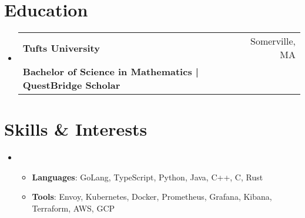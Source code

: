 \documentclass[letterpaper,11pt]{article}
\makeatletter
\newcommand{\cvitem}[1]{
  \item\small{
    {#1\vspace{-2pt}}
  }
}
\newcommand{\cvheading}[4]{
  \vspace{-2pt}\item
    \begin{tabular*}{\textwidth}[t]{l@{\extracolsep{\fill}}r}
      \textbf{#1} & #2 \\
      \small#3 & \small #4 \\
    \end{tabular*}\vspace{-9pt}
}
\newcommand{\cvheadingstart}{\begin{itemize}[leftmargin=0in, label={}]}
\newcommand{\cvheadingend}{\end{itemize}}
\newcommand{\cvitemstart}{\begin{itemize}\justifying}
\newcommand{\cvitemend}{\end{itemize}\vspace{-5pt}}
\makeatother
\begin{document}
\section{Education}
\cvheadingstart
  \cvheading
    {Tufts University}{Somerville, MA}
    {\textbf{Bachelor of Science in Mathematics | QuestBridge Scholar} }{}
\cvheadingend

\section{Skills \& Interests}
\cvheadingstart
\item
\cvitemstart
    \cvitem{\textbf{Languages}: GoLang, TypeScript, Python, Java, C++, C, Rust}
    \cvitem{\textbf{Tools}: Envoy, Kubernetes, Docker, Prometheus, Grafana, Kibana, Terraform, AWS, GCP}
\cvitemend
\cvheadingend
\end{document}
